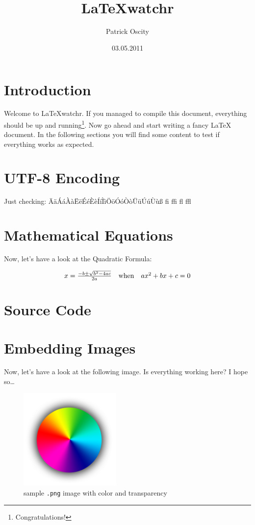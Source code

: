 \documentclass[a4paper,12pt]{scrartcl}
\title{\LaTeX{}watchr}
\author{Patrick Oscity}
\date{03.05.2011}
\begin{document}
\maketitle
\tableofcontents
\pagebreak


\section{Introduction}

Welcome to \LaTeX{}watchr. If you managed to compile this document, everything should be up and running\footnote{Congratulations!}. Now go ahead and start writing a fancy \LaTeX{} document. In the following sections you will find some content to test if everything works as expected.



\section{UTF-8 Encoding}

Just checking: ÄäÁáÀàËëÉéÈèÍíÌìÖöÓóÒòÜüÚúÙùß fi ffi fl ffl



\section{Mathematical Equations}

Now, let's have a look at the Quadratic Formula:

\begin{equation}
    \begin{array}{*{20}c}
       {x = \frac{{ - b \pm \sqrt {b^2  - 4ac} }}{{2a}}} & {{\rm{when}}} & {ax^2  + bx + c = 0}  \\
    \end{array}
\end{equation}



\section{Source Code}





\section{Embedding Images}

Now, let's have a look at the following image. Is everything working here? I hope so…

\begin{figure}[h]
    \centering
    \includegraphics[width=50mm]{images/sample_image.png}
    \caption{sample \lstinline{.png} image with color and transparency}
\end{figure}
\end{document}
